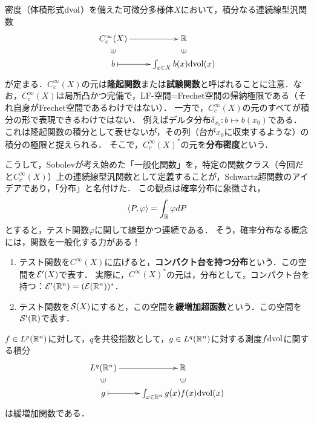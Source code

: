 \documentclass[uplatex,dvipdfmx]{jsreport}
\begin{document}
\begin{discussion}
    密度（体積形式$\mathrm{dvol}$）を備えた可微分多様体$X$において，積分なる連続線型汎関数
    \[\xymatrix@R-2pc{
        C^\infty_c(X)\ar[r]&\R\\
        \rotatebox[origin=c]{90}{$\in$}&\rotatebox[origin=c]{90}{$\in$}\\
        b\ar@{|->}[r]&\int_{x\in X}b(x)\dvol(x)
    }\]
    が定まる．$C_c^\infty(X)$の元は\textbf{隆起関数}または\textbf{試験関数}と呼ばれることに注意．なお，$C_c^\infty(X)$は局所凸かつ完備で，LF-空間=Frechet空間の帰納極限である（それ自身がFrechet空間であるわけではない）．
    一方で，$C_c^\infty(X)$の元のすべてが積分の形で表現できるわけではない．
    例えばデルタ分布$\delta_{x_0}:b\mapsto b(x_0)$である．
    これは隆起関数の積分として表せないが，その列（台が$x_0$に収束するような）の積分の極限と捉えられる．
    そこで，$C_c^\infty(X)^*$の元を\textbf{分布密度}という．
\end{discussion}
\begin{remarks}
    こうして，Sobolevが考え始めた「一般化関数」を，特定の関数クラス（今回だと$C_c^\infty(X)$）上の連続線型汎関数として定義することが，Schwartz超関数のアイデアであり，「分布」と名付けた．
    この観点は確率分布に象徴され，
    \[\langle P,\varphi\rangle=\int_{\mathbb{R}}\varphi dP\]
    とすると，テスト関数$\varphi$に関して線型かつ連続である．
    そう，確率分布なる概念には，関数を一般化する力がある！
\end{remarks}

\begin{definition}\mbox{}
    \begin{enumerate}
        \item テスト関数を$C^\infty(X)$に広げると，\textbf{コンパクト台を持つ分布}という．この空間を$\mathcal{E}'(X)$で表す．
        実際に，$C^\infty(X)^*$の元は，分布として，コンパクト台を持つ：$\mathcal{E}'(\mathbb{R}^n)=(\mathcal{E}(\mathbb{R}^n))^*$．
        \item テスト関数を$\mathcal{S}(X)$にすると，この空間を\textbf{緩増加超函数}という．この空間を$\mathcal{S}'(\mathbb{R})$で表す．
    \end{enumerate}
\end{definition}

\begin{example}
    $f\in L^p(\mathbb{R}^n)$に対して，$q$を共役指数として，$g\in L^q(\mathbb{R}^n)$に対する測度$f\mathrm{dvol}$に関する積分
    \[\xymatrix@R-2pc{
        L^q(\R^n)\ar[r]&\R\\
        \rotatebox[origin=c]{90}{$\in$}&\rotatebox[origin=c]{90}{$\in$}\\
        g\ar@{|->}[r]&\int_{x\in\R^n}g(x)f(x)\dvol(x)
    }\]
    は緩増加関数である．
\end{example}
\end{document}
